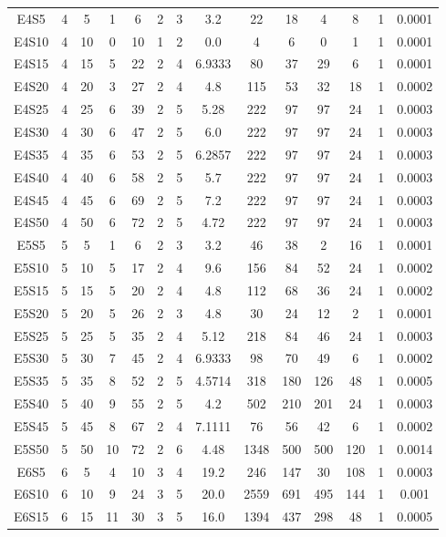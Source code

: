 \documentclass[letter, 10pt]{article}
\begin{document}
\begin{landscape}
\begin{longtable}{|c|c|c|c|c|c|c|c|c|c|c|c|c|c|}
E4S5 & 4 & 5 & 1 & 6 & 2 & 3 & 3.2 & 22 & 18 & 4 & 8 & 1 & 0.0001 \\
E4S10 & 4 & 10 & 0 & 10 & 1 & 2 & 0.0 & 4 & 6 & 0 & 1 & 1 & 0.0001 \\
E4S15 & 4 & 15 & 5 & 22 & 2 & 4 & 6.9333 & 80 & 37 & 29 & 6 & 1 & 0.0001 \\
E4S20 & 4 & 20 & 3 & 27 & 2 & 4 & 4.8 & 115 & 53 & 32 & 18 & 1 & 0.0002 \\
E4S25 & 4 & 25 & 6 & 39 & 2 & 5 & 5.28 & 222 & 97 & 97 & 24 & 1 & 0.0003 \\
E4S30 & 4 & 30 & 6 & 47 & 2 & 5 & 6.0 & 222 & 97 & 97 & 24 & 1 & 0.0003 \\
E4S35 & 4 & 35 & 6 & 53 & 2 & 5 & 6.2857 & 222 & 97 & 97 & 24 & 1 & 0.0003 \\
E4S40 & 4 & 40 & 6 & 58 & 2 & 5 & 5.7 & 222 & 97 & 97 & 24 & 1 & 0.0003 \\
E4S45 & 4 & 45 & 6 & 69 & 2 & 5 & 7.2 & 222 & 97 & 97 & 24 & 1 & 0.0003 \\
E4S50 & 4 & 50 & 6 & 72 & 2 & 5 & 4.72 & 222 & 97 & 97 & 24 & 1 & 0.0003 \\
E5S5 & 5 & 5 & 1 & 6 & 2 & 3 & 3.2 & 46 & 38 & 2 & 16 & 1 & 0.0001 \\
E5S10 & 5 & 10 & 5 & 17 & 2 & 4 & 9.6 & 156 & 84 & 52 & 24 & 1 & 0.0002 \\
E5S15 & 5 & 15 & 5 & 20 & 2 & 4 & 4.8 & 112 & 68 & 36 & 24 & 1 & 0.0002 \\
E5S20 & 5 & 20 & 5 & 26 & 2 & 3 & 4.8 & 30 & 24 & 12 & 2 & 1 & 0.0001 \\
E5S25 & 5 & 25 & 5 & 35 & 2 & 4 & 5.12 & 218 & 84 & 46 & 24 & 1 & 0.0003 \\
E5S30 & 5 & 30 & 7 & 45 & 2 & 4 & 6.9333 & 98 & 70 & 49 & 6 & 1 & 0.0002 \\
E5S35 & 5 & 35 & 8 & 52 & 2 & 5 & 4.5714 & 318 & 180 & 126 & 48 & 1 & 0.0005 \\
E5S40 & 5 & 40 & 9 & 55 & 2 & 5 & 4.2 & 502 & 210 & 201 & 24 & 1 & 0.0003 \\
E5S45 & 5 & 45 & 8 & 67 & 2 & 4 & 7.1111 & 76 & 56 & 42 & 6 & 1 & 0.0002 \\
E5S50 & 5 & 50 & 10 & 72 & 2 & 6 & 4.48 & 1348 & 500 & 500 & 120 & 1 & 0.0014 \\
E6S5 & 6 & 5 & 4 & 10 & 3 & 4 & 19.2 & 246 & 147 & 30 & 108 & 1 & 0.0003 \\
E6S10 & 6 & 10 & 9 & 24 & 3 & 5 & 20.0 & 2559 & 691 & 495 & 144 & 1 & 0.001 \\
E6S15 & 6 & 15 & 11 & 30 & 3 & 5 & 16.0 & 1394 & 437 & 298 & 48 & 1 & 0.0005 \\

\end{longtable}
\end{landscape}
\end{document}
